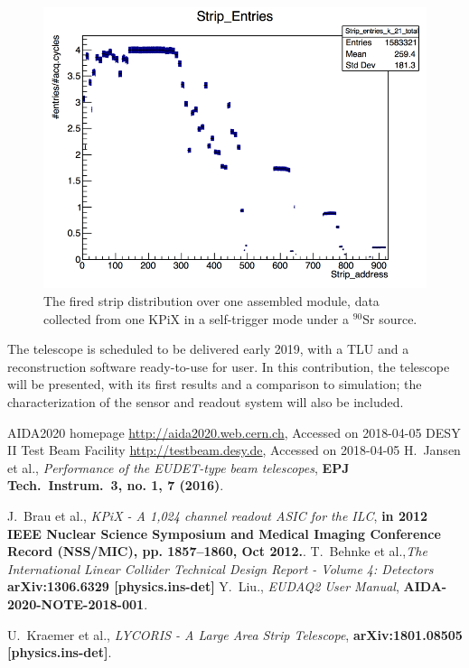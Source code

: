 \begin{figure}[!ht]%
\centering
\includegraphics[width=0.46\linewidth]{pics/S58_K2_2018_05_07_16_49_42_strip_entries.png}
\caption{The fired strip distribution over one assembled module, data collected from one KPiX in a self-trigger mode under a $^{90}$Sr source. }%
\label{fig:2figs}%
\end{figure}

The \lycoris telescope is scheduled to be delivered early 2019, with a TLU and a reconstruction software ready-to-use for user.
In this contribution, the \lycoris telescope will be presented, with its first results and a comparison to simulation;
the characterization of the sensor and readout system will also be included.

\footnotesize
\begin{thebibliography}{1}
 AIDA2020 homepage \url{http://aida2020.web.cern.ch}, Accessed on 2018-04-05
 DESY II Test Beam Facility \url{http://testbeam.desy.de}, Accessed on 2018-04-05
 H.~Jansen et al., {\em Performance of the EUDET-type beam telescopes},
\textbf{EPJ Tech.\ Instrum.\  {\bf 3}, no. 1, 7 (2016)}.

 J.~Brau et al., {\em KPiX - A 1,024 channel readout ASIC for the ILC},
\textbf{in 2012 IEEE Nuclear Science Symposium and Medical Imaging Conference Record (NSS/MIC), pp. 1857–1860, Oct 2012.}.
  T.~Behnke et al.,{\em The International Linear Collider Technical Design Report - Volume 4: Detectors}
\textbf{  arXiv:1306.6329 [physics.ins-det]}
 Y.~Liu., {\em EUDAQ2 User Manual},
\textbf{AIDA-2020-NOTE-2018-001}.

 U.~Kraemer et al., {\em LYCORIS - A Large Area Strip Telescope},
\textbf{arXiv:1801.08505 [physics.ins-det]}.


\end{thebibliography}


